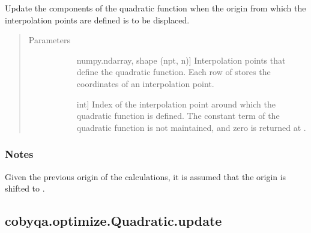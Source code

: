 \documentclass[letterpaper,10pt,english]{sphinxmanual}
\begin{document}
\begin{fulllineitems}
\begin{fulllineitems}
\label{\detokenize{refs/generated/cobyqa.optimize.Quadratic.shift_interpolation_points:cobyqa.optimize.Quadratic.shift_interpolation_points}}
\sphinxAtStartPar
Update the components of the quadratic function when the origin from
which the interpolation points are defined is to be displaced.
\begin{quote}\begin{description}
\item[{Parameters}] \leavevmode\begin{description}
\item[{}] \leavevmode{[}numpy.ndarray, shape (npt, n){]}
\sphinxAtStartPar
Interpolation points that define the quadratic function. Each row of
 stores the coordinates of an interpolation point.

\item[{}] \leavevmode{[}int{]}
\sphinxAtStartPar
Index of the interpolation point around which the quadratic function
is defined. The constant term of the quadratic function is not
maintained, and zero is returned at .

\end{description}

\end{description}\end{quote}
\subsubsection*{Notes}

\sphinxAtStartPar
Given  the previous origin of the calculations, it is assumed
that the origin is shifted to .

\end{fulllineitems}



\subsection{cobyqa.optimize.Quadratic.update}
\label{\detokenize{refs/generated/cobyqa.optimize.Quadratic.update:cobyqa-optimize-quadratic-update}}\label{\detokenize{refs/generated/cobyqa.optimize.Quadratic.update::doc}}


\end{fulllineitems}
\end{document}
